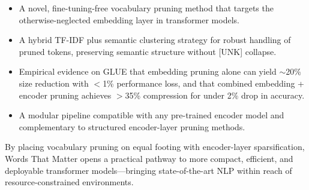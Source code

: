 \documentclass[twocolumn]{article}
\begin{document}
\begin{itemize}
    \item A novel, fine-tuning-free vocabulary pruning method that targets the otherwise-neglected embedding layer in transformer models.
    
    \item A hybrid TF-IDF plus semantic clustering strategy for robust handling of pruned tokens, preserving semantic structure without [UNK] collapse.
    
    \item Empirical evidence on GLUE that embedding pruning alone can yield $\sim$20\% size reduction with $<$1\% performance loss, and that combined embedding + encoder pruning achieves $>$35\% compression for under 2\% drop in accuracy.
    
    \item A modular pipeline compatible with any pre-trained encoder model and complementary to structured encoder-layer pruning methods.
\end{itemize}
By placing vocabulary pruning on equal footing with encoder-layer sparsification, Words That Matter opens a practical pathway to more compact, efficient, and deployable transformer models---bringing state-of-the-art NLP within reach of resource-constrained environments.
\end{document}
